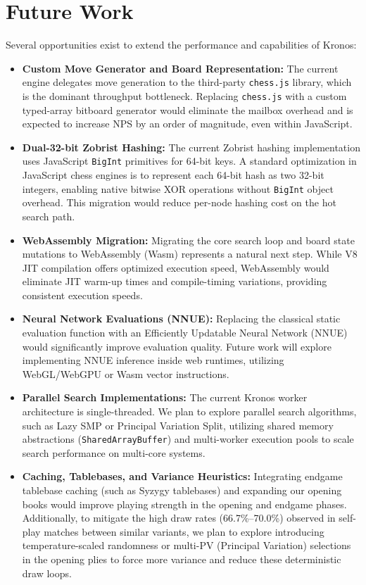 \chapter{Future Work}
\label{ch:future_work}

Several opportunities exist to extend the performance and capabilities of Kronos:
\begin{itemize}
    \item \textbf{Custom Move Generator and Board Representation:} The current engine delegates move generation to the third-party \texttt{chess.js} library, which is the dominant throughput bottleneck. Replacing \texttt{chess.js} with a custom typed-array bitboard generator would eliminate the mailbox overhead and is expected to increase NPS by an order of magnitude, even within JavaScript.
    \item \textbf{Dual-32-bit Zobrist Hashing:} The current Zobrist hashing implementation uses JavaScript \texttt{BigInt} primitives for 64-bit keys. A standard optimization in JavaScript chess engines is to represent each 64-bit hash as two 32-bit integers, enabling native bitwise XOR operations without \texttt{BigInt} object overhead. This migration would reduce per-node hashing cost on the hot search path.
    \item \textbf{WebAssembly Migration:} Migrating the core search loop and board state mutations to WebAssembly (Wasm) represents a natural next step. While V8 JIT compilation offers optimized execution speed, WebAssembly would eliminate JIT warm-up times and compile-timing variations, providing consistent execution speeds.
    \item \textbf{Neural Network Evaluations (NNUE):} Replacing the classical static evaluation function with an Efficiently Updatable Neural Network (NNUE) would significantly improve evaluation quality. Future work will explore implementing NNUE inference inside web runtimes, utilizing WebGL/WebGPU or Wasm vector instructions.
    \item \textbf{Parallel Search Implementations:} The current Kronos worker architecture is single-threaded. We plan to explore parallel search algorithms, such as Lazy SMP or Principal Variation Split, utilizing shared memory abstractions (\texttt{SharedArrayBuffer}) and multi-worker execution pools to scale search performance on multi-core systems.
    \item \textbf{Caching, Tablebases, and Variance Heuristics:} Integrating endgame tablebase caching (such as Syzygy tablebases) and expanding our opening books would improve playing strength in the opening and endgame phases. Additionally, to mitigate the high draw rates (66.7\%--70.0\%) observed in self-play matches between similar variants, we plan to explore introducing temperature-scaled randomness or multi-PV (Principal Variation) selections in the opening plies to force more variance and reduce these deterministic draw loops.
\end{itemize}
